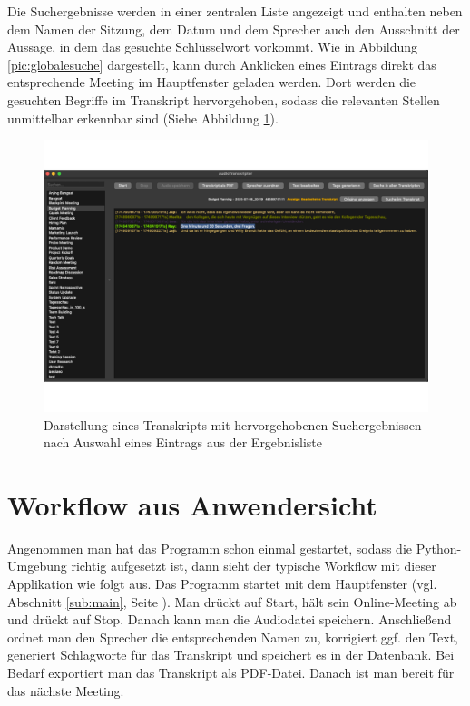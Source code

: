 Die Suchergebnisse werden in einer zentralen Liste angezeigt und enthalten neben dem Namen der Sitzung, dem Datum und dem Sprecher auch den Ausschnitt der Aussage, in dem das gesuchte Schlüsselwort vorkommt. Wie in Abbildung  \ref{pic:globalesuche}  dargestellt, kann durch Anklicken eines Eintrags direkt das entsprechende Meeting im Hauptfenster geladen werden. Dort werden die gesuchten Begriffe im Transkript hervorgehoben, sodass die relevanten Stellen unmittelbar erkennbar sind (Siehe Abbildung \ref{pic:markiertertreffer}). 

\begin{figure}[h]
\centering
\includegraphics[width=0.7\linewidth]{Bilder/markierterTreffer}
\caption[Protokolsuche]{Darstellung eines Transkripts mit hervorgehobenen Suchergebnissen nach Auswahl eines Eintrags aus der Ergebnisliste}
\label{pic:markiertertreffer}
\end{figure}

\section{Workflow aus Anwendersicht}
\label{sec:workflow}

Angenommen man hat das Programm schon einmal gestartet, sodass die Python-Umgebung richtig aufgesetzt ist, dann sieht der typische Workflow mit dieser Applikation wie folgt aus. Das Programm startet mit dem Hauptfenster (vgl. Abschnitt \ref{sub:main}, Seite \pageref{sub:main}). Man drückt auf \glqq Start\grqq , hält sein Online-Meeting ab und drückt auf \glqq Stop\grqq . Danach kann man die Audiodatei speichern. Anschließend ordnet man den Sprecher die entsprechenden Namen zu, korrigiert ggf. den Text, generiert Schlagworte für das Transkript und speichert es in der Datenbank. Bei Bedarf exportiert man das Transkript als PDF-Datei. Danach ist man bereit für das nächste Meeting.

